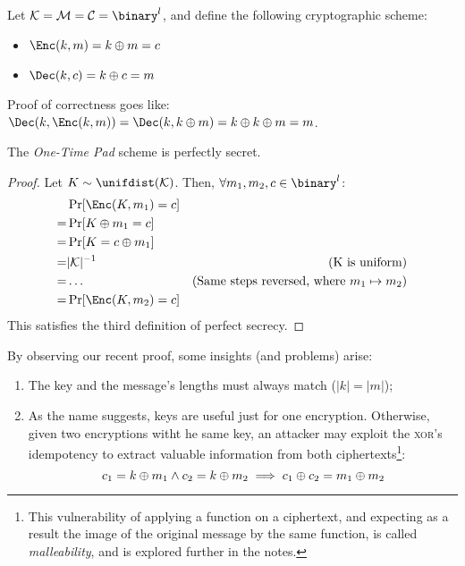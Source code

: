 Let $\K = \M = \C = \binary^l$, and define the following cryptographic scheme:
\begin{itemize}
    \item $\Enc(k, m) = k \xor m = c$
    \item $\Dec(k, c) = k \xor c = m$
\end{itemize}

Proof of correctness goes like: $\Dec(k, \Enc(k, m)) = \Dec(k, k \xor m) = k \xor k \xor m = m$.

\begin{theorem}
    The \emph{One-Time Pad} scheme is perfectly secret.
\end{theorem}
\begin{proof}
    Let $K \sim \unifdist(\K)$. Then, $\forall m_1, m_2, c \in \binary^l$:
    \begin{align*}
        & \Pr[\Enc(K, m_1) = c]     & \\
        =& \Pr[K \xor m_1 = c]      & \\
        =& \Pr[K = c \xor m_1]      & \\
        =& |\K|^{-1}                & \text{(K is uniform)} \\
        =& \dots                    & \text{(Same steps reversed, where $m_1 \mapsto m_2$)} \\
        =& \Pr[\Enc(K, m_2) = c]    & \\  
    \end{align*}
    This satisfies the third definition of perfect secrecy.
\end{proof}


By observing our recent proof, some insights (and problems) arise:
\begin{enumerate}
    \item The key and the message's lengths must always match ($|k| = |m|$);
    \item As the name suggests, keys are useful just for one encryption. Otherwise, given two encryptions witht he same key, an attacker may exploit the \textsc{xor}'s idempotency to extract valuable information from both ciphertexts\footnote{This vulnerability of applying a function on a ciphertext, and expecting as a result the image of the original message by the same function, is called \emph{malleability}, and is explored further in the notes.}:
    \[
        c_1 = k \oplus m_1 \wedge c_2 = k \oplus m_2 \implies c_1 \oplus c_2 = m_1 \oplus m_2
    \]
    
\end{enumerate}


